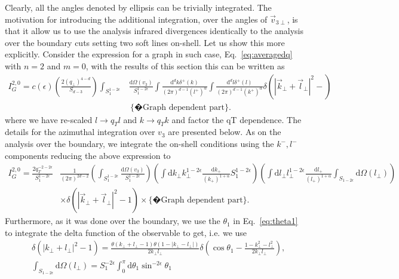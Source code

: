 \documentclass[a4paper,11pt]{article}
\numberwithin{equation}{section}
\newcommand{\dd}{\text{d}}
\newcommand{\eps}{\epsilon}
\begin{document}
Clearly, all the angles denoted by  ellipsis can be trivially integrated. The motivation for introducing the additional integration, over the angles of $\vec v_{3\perp}$, is that it allow us to use the analysis infrared divergences identically to the analysis over the boundary cuts setting two soft lines on-shell. Let us show this more explicitly. Consider the expression for a graph in such case,  Eq.~\eqref{eq:averagedq} 
with $n=2$ and $m=0$, with the results of this section this can be written as
\begin{align}
I_G^{2,0}=c(\eps) 
\left( \frac{2 (q_\perp)^{4-d}}{S_{d-3}}\right)  \int_{S_1^{1-2\eps}}&  \frac{ \dd\Omega(v_3)}{S_1^{1-2\eps}} 
\int \frac{\dd^d k\delta^+(k)}{(2\pi)^{d-1}(l^+)^\alpha}   
\int \frac{\dd^d l\delta^+(l)}{(2\pi)^{d-1}(k^+)^\alpha}   
 \delta\left(\left| \vec k_\perp+\vec l_\perp \right|^2-\right) \\
& \,\{�\text{Graph dependent part} \} . 
\end{align}
where we have re-scaled $l\to q_T l$ and $k\to q_T k$ and factor the qT dependence. The details for the azimuthal integration over $v_3$ are presented below. As on the analysis over the boundary, we integrate the on-shell conditions using the $k^-,l^-$ components reducing the above expression to
%
\begin{align}
I_G^{2,0}=   \frac{2 q_T^{-2-2\eps}}{S_1^{1-2\eps}}     
&\frac{1}{(2\pi)^{2d-2}}  \left( \int_{S_1^{1-2\epsilon}} \frac{\dd\Omega(v_3)}{S_1^{1-2\eps}} \right)
\left(\int \dd k_\perp k_\perp^{1-2\eps}\frac{\dd k_+}{(k_+)^{1+\alpha}} S_1^{1-2\eps} \right)
\left( \int \dd l_\perp l_\perp^{1-2\eps}\frac{\dd l_+}{(l_+)^{1+\alpha}}   
\int_{S_{1-2\eps}} \dd\Omega(l_\perp) \right) \, 
\nonumber\\
&\times \delta\left(\left| \vec k_\perp+\vec l_\perp \right|^2-1\right) 
\times \{�\text{Graph dependent part} \} . 
\end{align}
%
Furthermore, as it was done over the boundary, we use 
the $\theta_1$ in Eq.~\eqref{eq:theta1} to integrate the delta function of the 
observable to get, i.e. we use
%
\begin{align}
&\delta\left(|k_\perp+l_\perp|^2-1\right)=
\frac{\theta(k_\perp+l_\perp-1) \theta(1-|k_\perp-l_\perp|)}
{2k_\perp l_\perp} \delta\left(\cos\theta_1 -\frac{1- k_\perp^2-l_\perp^2}{2k_\perp l_\perp }\right), \\
&\int_{S_{1-2\epsilon}} \dd \Omega(l_\perp)= 
S_{1}^{-2\epsilon} \int_0^\pi \dd\theta_1 \sin^{-2\eps}\theta_1
\end{align}
\end{document}
